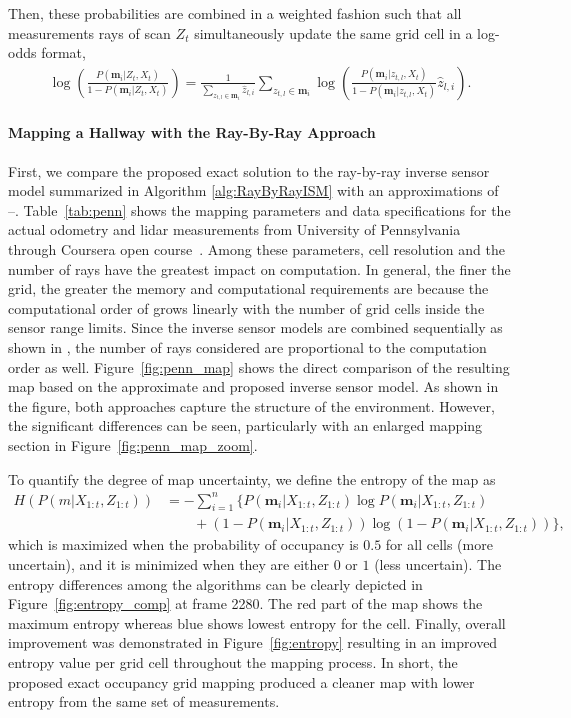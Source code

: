 Then, these probabilities are combined in a weighted fashion such that all measurements rays of scan $Z_t$ simultaneously update the same grid cell in a log-odds format,
\begin{align}
\label{eqn:ISM_Approx_2}
\log\left(\frac{P(\mathbf{m}_i|Z_{t},X_t)}{1-P(\mathbf{m}_i|Z_{t},X_t)}\right)
=
\frac1{\sum_{z_{t,l}\in\mathbf{m}_i}\hat z_{l,i}}\sum_{z_{t,l}\in\mathbf{m}_i}\log\left(\frac{P(\mathbf{m}_i|z_{t,l},X_t)}{1-P(\mathbf{m}_i|z_{t,l},X_t)}\hat z_{l,i}\right).
\end{align}


\paragraph{Mapping a Hallway with the Ray-By-Ray Approach}

First, we compare the proposed exact solution to the ray-by-ray inverse sensor model summarized in Algorithm \ref{alg:RayByRayISM} with an approximations of --.
Table~\ref{tab:penn} shows the mapping parameters and data specifications for the actual odometry and lidar measurements from University of Pennsylvania through Coursera open course~\cite{coursera}. Among these parameters, cell resolution and the number of rays have the greatest impact on computation. In general, the finer the grid, the greater the memory and computational requirements are because the computational order of  grows linearly with the number of grid cells inside the sensor range limits. Since the inverse sensor models are combined sequentially as shown in , the number of rays considered are proportional to the computation order as well.
Figure~\ref{fig:penn_map} shows the direct comparison of the resulting map based on the approximate and proposed inverse sensor model.
As shown in the figure, both approaches capture the structure of the environment. However, the significant differences can be seen, particularly with an enlarged mapping section in Figure~\ref{fig:penn_map_zoom}.

To quantify the degree of map uncertainty, we define the entropy of the map as 
\begin{align*}
H(P(m|X_{1:t},Z_{1:t}))&=-\sum_{i=1}^n\big\{P(\mathbf{m}_i|X_{1:t},Z_{1:t})\log P(\mathbf{m}_i|X_{1:t},Z_{1:t})\nonumber\\
&\qquad+(1-P(\mathbf{m}_i|X_{1:t},Z_{1:t}))\log(1-P(\mathbf{m}_i|X_{1:t},Z_{1:t}))\big\},
\end{align*}
which is maximized when the probability of occupancy is $0.5$ for all cells (more uncertain), and it is minimized when they are either $0$ or $1$ (less uncertain). 
The entropy differences among the algorithms can be clearly depicted in Figure~\ref{fig:entropy_comp} at frame 2280.
The red part of the map shows the maximum  entropy whereas blue shows lowest entropy for the cell.
Finally, overall improvement was demonstrated in Figure~\ref{fig:entropy} resulting in an improved entropy value per grid cell throughout the mapping process.
In short, the proposed exact occupancy grid mapping produced a cleaner map with lower entropy from the same set of measurements.

